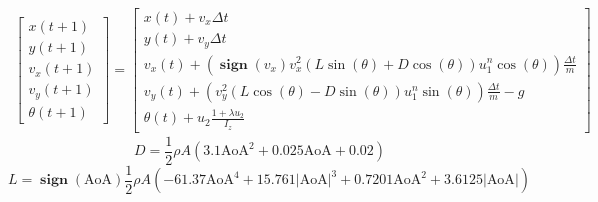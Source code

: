 \documentclass[lettersize]{article}
\title{}
\author{}
\date{\today}
\numberwithin{equation}{section}
\DeclareMathOperator*{\sign}{\mathbf{sign}}
\begin{document}
\begin{align*}
\begin{bmatrix}
x(t+1) \\
y(t+1) \\
v_x(t+1) \\
v_y(t+1) \\
\theta(t+1)
\end{bmatrix} = \begin{bmatrix}
x(t) + v_x \Delta t \\
y(t) + v_y \Delta t \\
v_x(t) + \left(\sign(v_x) v_x^2 \left(L \sin(\theta) + D \cos(\theta)\right)
u_1^n \cos(\theta)\right)\frac{\Delta t}{m} \\
v_y(t) + \left(v_y^2 \left(L \cos(\theta) - D \sin(\theta)\right)
u_1^n \sin(\theta)\right)\frac{\Delta t}{m} - g\\
\theta(t) + u_2 \frac{1 + \lambda u_2}{I_z}
\end{bmatrix}
\end{align*}
\[ D = \frac{1}{2} \rho A \left( 3.1 \text{AoA}^2 + 0.025 \text{AoA} +
0.02\right) \]
\[ L = \sign(\text{AoA})\frac{1}{2} \rho A \left( -61.37 \text{AoA}^4 + 15.761
\left|\text{AoA}\right|^3 + 0.7201 \text{AoA}^2 + 3.6125 \left| \text{AoA}
\right|\right) \]


\end{document}
